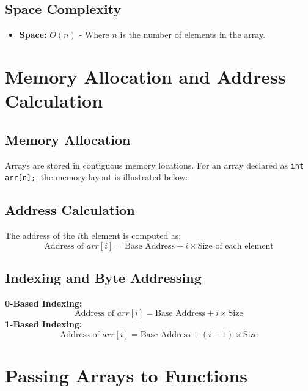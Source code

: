 \subsection*{Space Complexity}
\begin{itemize}
  \item \textbf{Space:} \(O(n)\) - Where \(n\) is the number of elements in the array.
\end{itemize}

\section{Memory Allocation and Address Calculation}

\subsection*{Memory Allocation}
Arrays are stored in contiguous memory locations. For an array declared as \texttt{int arr[n];}, the memory layout is illustrated below:

\begin{center}
\end{center}

\subsection*{Address Calculation}
The address of the \(i\)th element is computed as:
\[
\text{Address of } arr[i] = \text{Base Address} + i \times \text{Size of each element}
\]

\subsection*{Indexing and Byte Addressing}
\textbf{0-Based Indexing:}
\[
\text{Address of } arr[i] = \text{Base Address} + i \times \text{Size}
\]
\textbf{1-Based Indexing:}
\[
\text{Address of } arr[i] = \text{Base Address} + (i-1) \times \text{Size}
\]

\section{Passing Arrays to Functions}
